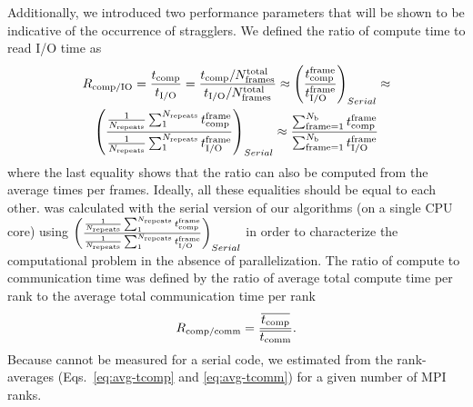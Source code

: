 Additionally, we introduced two performance parameters that will be shown to be indicative of the occurrence of stragglers.
We defined the ratio of compute time to read I/O time as
\begin{multline}
  \RcompIO = \frac{\tcomp}{\tIO} = %
  \frac{\tcomp/N_{\text{frames}}^{\text{total}}}{\tIO/N_{\text{frames}}^{\text{total}}} \approx \left (\frac{\tcomp^{\text{frame}}}{\tIO^{\text{frame}}}\right )_{Serial} \approx   \\
  \left (\frac{\frac{1}{N_{\text{repeats}}}\sum_{1}^{N_{\text{repeats}}}\tcomp^{\text{frame}}}{\frac{1}{N_{\text{repeats}}}\sum_{1}^{N_{\text{repeats}}}\tIO^{\text{frame}}}\right )_{Serial} \approx 
  \frac{\sum_{\text{frame}=1}^{N_{\text{b}}}\tcomp^{\text{frame}}}{\sum_{\text{frame}=1}^{N_{\text{b}}}\tIO^{\text{frame}}} 
  \label{eq:Compute-IO}
\end{multline}
where the last equality shows that the ratio can also be computed from the average times per frames.
Ideally, all these equalities should be equal to each other. 
\RcompIO was calculated with the serial version of our algorithms (on a single CPU core) using $\left (\frac{\frac{1}{N_{\text{repeats}}}\sum_{1}^{N_{\text{repeats}}}{t}_{\text{comp}}^{\text{frame}}}{\frac{1}{N_{\text{repeats}}}\sum_{1}^{N_{\text{repeats}}}{t}_{\text{I/O}}^{\text{frame}}}\right )_{Serial}$ in order to characterize the computational problem in the absence of parallelization.
The ratio of compute to communication time was defined by the ratio of average total compute time per rank to the average total communication time per rank  
\begin{equation}
  \label{eq:Compute-comm}
  R_{\text{comp/comm}} = \frac{\overline{{t}_{\text{comp}}}}{\overline{t_{\text{comm}}}}.
\end{equation}
Because \tcomm cannot be measured for a serial code, we estimated \Rcompcomm from the rank-averages (Eqs.~\ref{eq:avg-tcomp} and \ref{eq:avg-tcomm}) for a given number of MPI ranks.
